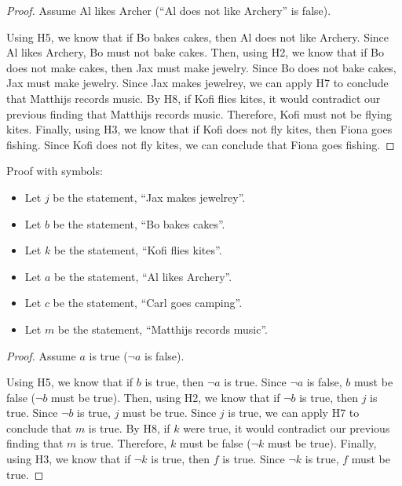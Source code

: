 \documentclass{article}
\begin{document}
\begin{enumerate}
          \begin{proof}
              Assume Al likes Archer (``Al does not like Archery'' is false).

              Using H5, we know that if Bo bakes cakes, then Al does not like Archery. Since
              Al likes Archery, Bo must not bake cakes. Then, using H2, we know that if Bo
              does not make cakes, then Jax must make jewelry. Since Bo does not bake cakes,
              Jax must make jewelry. Since Jax makes jewelrey, we can apply H7 to conclude
              that Matthijs records music. By H8, if Kofi flies kites, it would contradict
              our previous finding that Matthijs records music. Therefore, Kofi must not be
              flying kites. Finally, using H3, we know that if Kofi does not fly kites, then
              Fiona goes fishing. Since Kofi does not fly kites, we can conclude that Fiona
              goes fishing.

          \end{proof}

          Proof with symbols:

          \begin{itemize}
              \item Let $j$ be the statement, ``Jax makes jewelrey''.
              \item Let $b$ be the statement, ``Bo bakes cakes''.
              \item Let $k$ be the statement, ``Kofi flies kites''.
              \item Let $a$ be the statement, ``Al likes Archery''.
              \item Let $c$ be the statement, ``Carl goes camping''.
              \item Let $m$ be the statement, ``Matthijs records music''.

          \end{itemize}

          \begin{proof}
              Assume $a$ is true ($\neg a$ is false).

              Using H5, we know that if $b$ is true, then $\neg a$ is true. Since $\neg a$ is
              false, $b$ must be false ($\neg b$ must be true). Then, using H2, we know that
              if $\neg b$ is true, then $j$ is true. Since $\neg b$ is true, $j$ must be
              true. Since $j$ is true, we can apply H7 to conclude that $m$ is true. By H8,
              if $k$ were true, it would contradict our previous finding that $m$ is true.
              Therefore, $k$ must be false ($\neg k$ must be true). Finally, using H3, we
              know that if $\neg k$ is true, then $f$ is true. Since $\neg k$ is true, $f$
              must be true.


\end{proof}
\end{enumerate}
\end{document}
